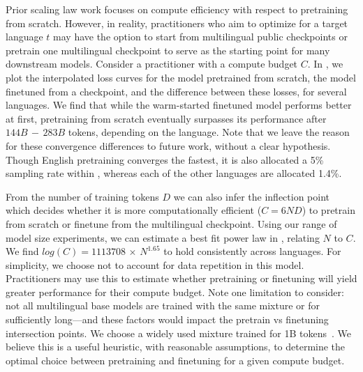 Prior scaling law work focuses on compute efficiency with respect to pretraining from scratch.
However, in reality, practitioners who aim to optimize for a target language $t$ may have the option to start from multilingual public checkpoints or pretrain one multilingual checkpoint to serve as the starting point for many downstream models.
Consider a practitioner with a compute budget $C$. 
In , we plot the interpolated loss curves for the model pretrained from scratch, the model finetuned from a checkpoint, and the difference between these losses, for several languages.
We find that while the warm-started finetuned model performs better at first, pretraining from scratch eventually surpasses its performance after $144B\,-\,283B$ tokens, depending on the language.
Note that we leave the reason for these convergence differences to future work, without a clear hypothesis.
Though English pretraining converges the fastest, it is also allocated a 5\% sampling rate within \unimax{}, whereas each of the other languages are allocated 1.4\%.


From the number of training tokens $D$ we can also infer the inflection point which decides whether it is more computationally efficient ($C=6ND$) to pretrain from scratch or finetune from the multilingual checkpoint.
Using our range of model size experiments, we can estimate a best fit power law in , relating $N$ to $C$.
We find $log(C)=1113708\,\times\,N^{1.65}$ to hold consistently across languages.
For simplicity, we choose not to account for data repetition in this model.
Practitioners may use this to estimate whether pretraining or finetuning will yield greater performance for their compute budget.
Note one limitation to consider: not all multilingual base models are trained with the same mixture or for sufficiently long---and these factors would impact the pretrain vs finetuning intersection points. We choose a widely used \unimax{} mixture trained for 1B tokens~\citep{chung2023unimax}. We believe this is a useful heuristic, with reasonable assumptions, to determine the optimal choice between pretraining and finetuning for a given compute budget.

